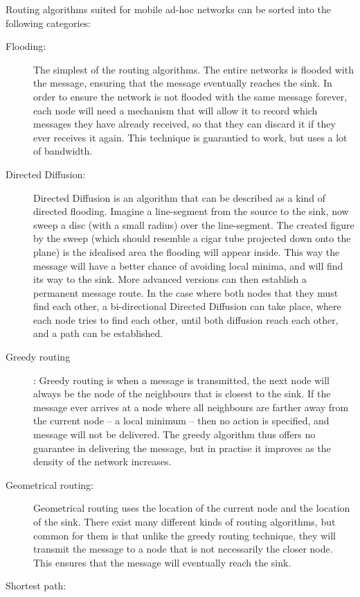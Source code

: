 \documentclass[letter, 12pt, english, draft]{article}
\begin{document}
Routing algorithms suited for mobile ad-hoc networks can be sorted into the following categories:
\begin{description}
\item[Flooding:] The simplest of the routing algorithms. The entire networks is flooded with the message, ensuring that the message eventually reaches the sink. In order to ensure the network is not flooded with the same message forever, each node will need a mechanism that will allow it to record which messages they have already received, so that they can discard it if they ever receives it again. This technique is guarantied to work, but uses a lot of bandwidth.

\item[Directed Diffusion:] Directed Diffusion is an algorithm that can be described as a kind of directed flooding. Imagine a line-segment from the source to the sink, now sweep a disc (with a small radius) over the line-segment. The created figure by the sweep (which should resemble a cigar tube projected down onto the plane) is the idealised area the flooding will appear inside. This way the message will have a better chance of avoiding local minima, and will find its way to the sink. More advanced versions can then establish a permanent message route. In the case where both nodes that they must find each other, a bi-directional Directed Diffusion can take place, where each node tries to find each other, until both diffusion reach each other, and a path can be established.

\item[Greedy routing]: Greedy routing is when a message is transmitted, the next node will always be the node of the neighbours that is closest to the sink. If the message ever arrives at a node where all neighbours are farther away from the current node -- a local minimum -- then no action is specified, and message will not be delivered. The greedy algorithm thus offers no guarantee in delivering the message, but in practise it improves as the density of the network increases.

\item[Geometrical routing:] Geometrical routing uses the location of the current node and the location of the sink. There exist many different kinds of routing algorithms, but common for them is that unlike the greedy routing technique, they will transmit the message to a node that is not necessarily the closer node. This ensures that the message will eventually reach the sink. 
 
\item[Shortest path:] 
\end{description}
\end{document}
